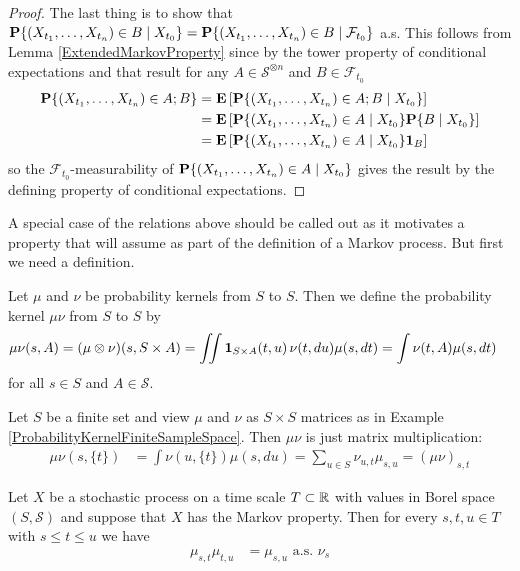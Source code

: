 \begin{proof}
The last thing is to show that
$\cprobability{X_{t_0}}{(X_{t_1},\dotsc, X_{t_n}) \in B} =
\cprobability{\mathcal{F}_{t_0}}{(X_{t_1},\dotsc, X_{t_n}) \in B}$
a.s.  This follows from Lemma \ref{ExtendedMarkovProperty} since by
the tower property of conditional expectations and that result 
for any $A \in \mathcal{S}^{\otimes n}$ and $B \in \mathcal{F}_{t_0}$
\begin{align*}
\probability{(X_{t_1}, \dotsc, X_{t_n}) \in A ; B} 
&=\expectation{\cprobability{X_{t_0}}{(X_{t_1}, \dotsc, X_{t_n}) \in A ;  B}} \\
&=\expectation{\cprobability{X_{t_0}}{(X_{t_1}, \dotsc, X_{t_n}) \in A}
\cprobability{X_{t_0}}{B}} \\
&=\expectation{\cprobability{X_{t_0}}{(X_{t_1}, \dotsc, X_{t_n}) \in A}
\characteristic{B}} \\
\end{align*}
so the $\mathcal{F}_{t_0}$-measurability of
$\cprobability{X_{t_0}}{(X_{t_1}, \dotsc, X_{t_n}) \in A}$ gives the
result by the defining property of conditional expectations.
\end{proof}
A special case of the relations above should be called out as it
motivates a property that will assume as part of the definition of a
Markov process.  But first we need a definition.
\begin{defn}Let $\mu$ and $\nu$ be probability kernels from $S$ to
  $S$.  Then we define the probability kernel $\mu \nu$ from $S$ to
  $S$ by
\begin{align*}
\mu \nu (s, A) 
&= (\mu \otimes \nu)(s,S \times A)
= \iint \characteristic{S \times A}(t,u) \, \nu(t, du) \mu(s, dt) 
= \int \nu(t, A) \mu(s, dt)
\end{align*}
for all $s \in S$ and $A \in \mathcal{S}$.
\end{defn}
\begin{examp}
Let $S$ be a finite set and view $\mu$ and $\nu$ as $S \times S$
matrices as in Example \ref{ProbabilityKernelFiniteSampleSpace}.  Then $\mu \nu$ is just matrix multiplication:
\begin{align*}
\mu \nu (s, \lbrace t \rbrace) 
&= \int \nu(u, \lbrace t \rbrace) \mu(s,du) 
=\sum_{u \in S} \nu_{u, t} \mu_{s, u} = (\mu \nu)_{s,t}
\end{align*}
\end{examp}
\begin{cor}\label{ChapmanKolmogorovWeak}Let $X$ be a stochastic
  process on a time scale $T \subset \reals$ with values in Borel
  space $(S, \mathcal{S})$ and suppose that $X$ has the Markov
  property.  Then for every $s, t, u \in T$ with $s \leq t \leq u$ we
  have
\begin{align*}
\mu_{s,t} \mu_{t,u} &= \mu_{s,u} \text{ a.s. $\nu_s$}
\end{align*}
\end{cor}
